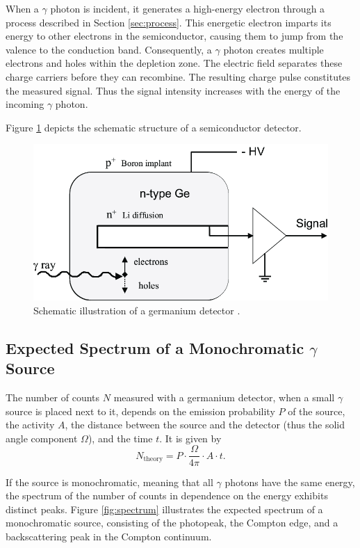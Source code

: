 \noindent
When a $\gamma$ photon is incident, it generates a high-energy 
electron through a process described in Section \ref{sec:process}. 
This energetic electron imparts its energy to other electrons in 
the semiconductor, causing them to jump from the valence to the 
conduction band. Consequently, a $\gamma$ photon creates multiple 
electrons and holes within the depletion zone. The electric field 
separates these charge carriers before they can recombine. The 
resulting charge pulse constitutes the measured signal. Thus the signal 
intensity increases with the energy of the incoming $\gamma$ photon.

\noindent
Figure \ref{fig:detector} depicts the schematic structure of a 
semiconductor detector.

\begin{figure}
    \centering
    \includegraphics[scale=0.4]{pictures/detector.png}
    \caption{Schematic illustration of a germanium detector \cite{detector}.}
    \label{fig:detector}
\end{figure}

\subsection{Expected Spectrum of a Monochromatic \texorpdfstring{$\gamma$}{gamma} Source}
The number of counts $N$ measured with a germanium detector, when a small 
$\gamma$ source is placed next to it, depends on the emission probability 
$P$ of the source, the activity $A$, the distance between the source and 
the detector (thus the solid angle component $\Omega$), and the time $t$. 
It is given by
\begin{equation}
    N_\text{theory} =  P \cdot \frac{\Omega}{4 \pi} \cdot A \cdot t.
\end{equation}

\noindent
If the source is monochromatic, meaning that all $\gamma$ photons have 
the same energy, the spectrum of the number of counts in dependence on 
the energy exhibits distinct peaks. Figure \ref{fig:spectrum} illustrates 
the expected spectrum of a monochromatic source, consisting of the 
photopeak, the Compton edge, and a backscattering peak in the Compton 
continuum. 


